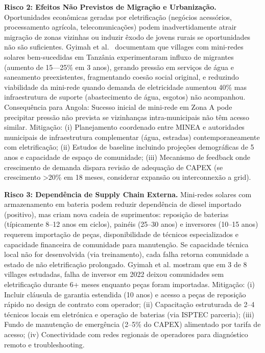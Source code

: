 \documentclass[12pt, a4paper]{article}
\begin{document}
{{{{{{{{{{{{\textbf{Risco 2: Efeitos Não Previstos de Migração e Urbanização.} Oportunidades econômicas geradas por eletrificação (negócios acessórios, processamento agrícola, telecomunicações) podem inadvertidamente atrair migração de zonas vizinhas ou induzir êxodo de jovens rurais se oportunidades não são suficientes. Gyimah et al.~\citep{Gyimah2024} documentam que villages com mini-redes solares bem-sucedidas em Tanzânia experimentaram influxo de migrantes (aumento de 15—25\% em 3 anos), gerando pressão em serviços de água e saneamento preexistentes, fragmentando coesão social original, e reduzindo viabilidade da mini-rede quando demanda de eletricidade aumentou 40\% mas infraestrutura de suporte (abastecimento de água, esgotos) não acompanhou. Consequência para Angola: Sucesso inicial de mini-rede em Zona A pode precipitar pressão não prevista se vizinhanças intra-municipais não têm acesso similar. Mitigação: (i) Planejamento coordenado entre MINEA e autoridades municipais de infraestrutura complementar (água, estradas) contemporaneamente com eletrificação; (ii) Estudos de baseline incluindo projeções demográficas de 5 anos e capacidade de espaço de comunidade; (iii) Mecanismo de feedback onde crescimento de demanda dispara revisão de adequação de CAPEX (se crescimento >20\% em 18 meses, considerar expansão ou interconnexão a grid).

\textbf{Risco 3: Dependência de Supply Chain Externa.} Mini-redes solares com armazenamento em bateria podem reduzir dependência de diesel importado (positivo), mas criam nova cadeia de suprimentos: reposição de baterias (típicamente 8--12 anos em ciclos), painéis (25--30 anos) e inversores (10--15 anos) requerem importação de peças, disponibilidade de técnicos especializados e capacidade financeira de comunidade para manutenção. Se capacidade técnica local não for desenvolvida (via treinamento), cada falha retorna comunidade a estado de não eletrificação prolongado. Gyimah et al. mostram que em 3 de 8 villages estudadas, falha de inversor em 2022 deixou comunidades sem eletrificação durante 6+ meses enquanto peças foram importadas. Mitigação: (i) Incluir cláusula de garantia estendida (10 anos) e acesso a peças de reposição rápido no design de contrato com operador; (ii) Capacitação estruturada de 2--4 técnicos locais em eletrónica e operação de baterias (via ISPTEC parceria); (iii) Fundo de manutenção de emergência (2--5\% do CAPEX) alimentado por tarifa de acesso; (iv) Conectividade com redes regionais de operadores para diagnóstico remoto e troubleshooting.

}}}}}}}}}}}}
\end{document}
